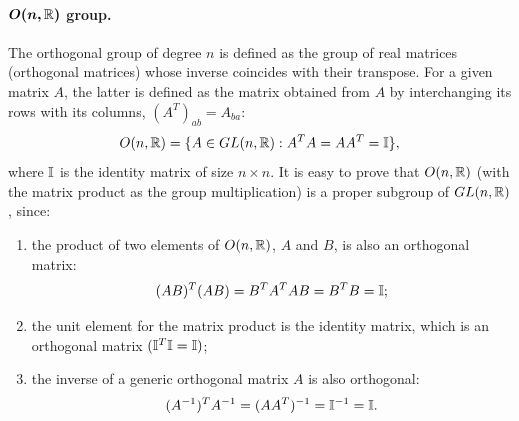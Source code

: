 \paragraph{$\bm{O(n,\mathbb{R})}$ group.} The orthogonal group of degree $n$ is defined as the group of real matrices (orthogonal matrices) whose inverse coincides with their transpose. For a given matrix $A$, the latter is defined as the matrix obtained from $A$ by interchanging its rows with its columns, $(A^T)_{ab} = A_{ba}$:
    \begin{equation}
        O(n, \mathbb{R}) = \{ A \in GL(n, \mathbb{R}) : A^T A = A A^T = \mathbb{I} \},
    \end{equation}
    where $\mathbb{I}$ is the identity matrix of size $n \times n$. It is easy to prove that $O(n, \mathbb{R})$ (with the matrix product as the group multiplication) is a proper subgroup of $GL(n, \mathbb{R})$, since:
    \begin{enumerate}
        \item the product of two elements of $O(n, \mathbb{R})$, $A$ and $B$, is also an orthogonal matrix:
        \begin{equation}
            (AB)^T (AB) = B^T A^T A B = B^T B = \mathbb{I};
        \end{equation}
        \item the unit element for the matrix product is the identity matrix, which is an orthogonal matrix $(\mathbb{I}^T \mathbb{I} = \mathbb{I})$;
        \item the inverse of a generic orthogonal matrix $A$ is also orthogonal:
        \begin{equation}
            (A^{-1})^T A^{-1} = (A A^T)^{-1} = \mathbb{I}^{-1} = \mathbb{I}.
        \end{equation}
    \end{enumerate}

